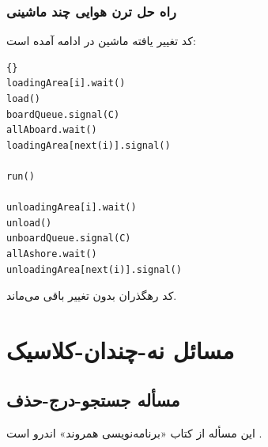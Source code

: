 \documentclass{book}
\newcommand{\clearemptydoublepage}{\newpage\cleardoublepage}
\begin{document}
\clearemptydoublepage
\subsection{راه حل ترن هوایی چند ماشینی}

    کد تغییر یافته ماشین در ادامه آمده است: 

\begin{latin}
\begin{lstlisting}[title=\rl{راه حل ترن هوایی  چند ماشینی (ماشین)}]{} 
loadingArea[i].wait()
load()
boardQueue.signal(C)
allAboard.wait()
loadingArea[next(i)].signal()

run()

unloadingArea[i].wait()
unload()
unboardQueue.signal(C)
allAshore.wait()
unloadingArea[next(i)].signal()
\end{lstlisting}
\end{latin}

    کد رهگذران بدون تغییر باقی می‌ماند. 
    


\clearemptydoublepage
\chapter{مسائل نه-چندان-کلاسیک}


\section{مسأله جستجو-درج-حذف}

    این مسأله از کتاب «برنامه‌نویسی همروند» اندرو است \cite{andrews}.
\end{document}

